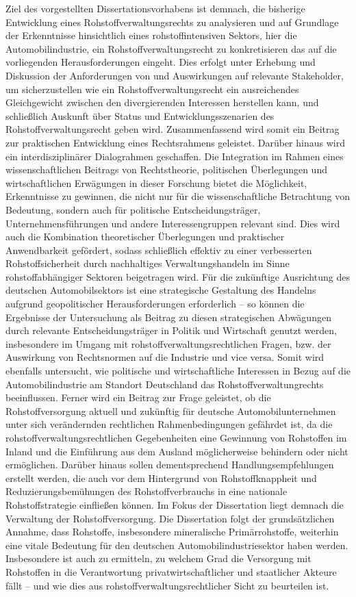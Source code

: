 \documentclass[12pt,a4paper,oneside]{book} %
\begin{document}
Ziel des vorgestellten Dissertationsvorhabens ist demnach, die bisherige Entwicklung eines Rohstoffverwaltungsrechts zu analysieren und auf Grundlage der Erkenntnisse hinsichtlich eines rohstoffintensiven Sektors, hier die Automobilindustrie, ein Rohstoffverwaltungsrecht zu konkretisieren das auf die vorliegenden Herausforderungen eingeht. Dies erfolgt unter Erhebung und Diskussion der Anforderungen von und Auswirkungen auf relevante Stakeholder, um sicherzustellen wie ein Rohstoffverwaltungsrecht ein ausreichendes Gleichgewicht zwischen den divergierenden Interessen herstellen kann, und schließlich Auskunft über Status und Entwicklungsszenarien des Rohstoffverwaltungsrecht geben wird. Zusammenfassend wird somit ein Beitrag zur praktischen Entwicklung eines Rechtsrahmens geleistet. Darüber hinaus wird ein interdisziplinärer Dialograhmen geschaffen. Die Integration im Rahmen eines wissenschaftlichen Beitrags von Rechtstheorie, politischen Überlegungen und wirtschaftlichen Erwägungen in dieser Forschung bietet die Möglichkeit, Erkenntnisse zu gewinnen, die nicht nur für die wissenschaftliche Betrachtung von Bedeutung, sondern auch für politische Entscheidungsträger, Unternehmensführungen und andere Interessengruppen relevant sind. Dies wird auch die Kombination theoretischer Überlegungen und praktischer Anwendbarkeit gefördert, sodass schließlich effektiv zu einer verbesserten Rohstoffsicherheit durch nachhaltiges Verwaltungshandeln im Sinne rohstoffabhängiger Sektoren beigetragen wird.
Für die zukünftige Ausrichtung des deutschen Automobilsektors ist eine strategische Gestaltung des Handelns aufgrund geopolitischer Herausforderungen erforderlich – so können die Ergebnisse der Untersuchung als Beitrag zu diesen strategischen Abwägungen durch relevante Entscheidungsträger in Politik und Wirtschaft genutzt werden, insbesondere im Umgang mit rohstoffverwaltungsrechtlichen Fragen, bzw. der Auswirkung von Rechtsnormen auf die Industrie und vice versa. Somit wird ebenfalls untersucht, wie politische und wirtschaftliche Interessen in Bezug auf die Automobilindustrie am Standort Deutschland das Rohstoffverwaltungrechts beeinflussen.
Ferner wird ein Beitrag zur Frage geleistet, ob die Rohstoffversorgung aktuell und zukünftig für deutsche Automobilunternehmen unter sich verändernden rechtlichen Rahmenbedingungen gefährdet ist, da die rohstoffverwaltungsrechtlichen Gegebenheiten eine Gewinnung von Rohstoffen im Inland und die Einführung aus dem Ausland möglicherweise behindern oder nicht ermöglichen. Darüber hinaus sollen dementsprechend Handlungsempfehlungen erstellt werden, die auch vor dem Hintergrund von Rohstoffknappheit und Reduzierungsbemühungen des Rohstoffverbrauchs in eine nationale Rohstoffstrategie einfließen können. Im Fokus der Dissertation liegt demnach die Verwaltung der Rohstoffversorgung. Die Dissertation folgt der grundsätzlichen Annahme, dass Rohstoffe, insbesondere mineralische Primärrohstoffe, weiterhin eine vitale Bedeutung für den deutschen Automobilindustriesektor haben werden. Insbesondere ist auch zu ermitteln, zu welchem Grad die Versorgung mit Rohstoffen in die Verantwortung privatwirtschaftlicher und staatlicher Akteure fällt – und wie dies aus rohstoffverwaltungsrechtlicher Sicht zu beurteilen ist.
\end{document}
